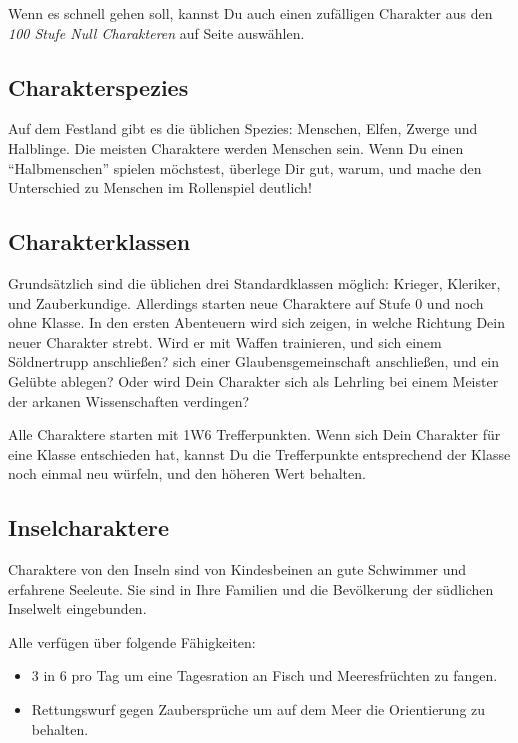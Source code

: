 \documentclass[11pt]{wbzine}
\begin{document}
\begin{multicols}{2}
Wenn es schnell gehen soll, kannst Du auch einen zufälligen
Charakter aus den \textit{100 Stufe Null Charakteren} auf Seite
\pageref{100char} auswählen.

\subsection{Charakterspezies}

Auf dem Festland gibt es die üblichen Spezies: Menschen, Elfen,
Zwerge und Halblinge. Die meisten Charaktere werden Menschen sein.
Wenn Du einen ``Halbmenschen'' spielen möchstest, überlege Dir gut,
warum, und mache den Unterschied zu Menschen im Rollenspiel
deutlich!

\subsection{Charakterklassen}

Grundsätzlich sind die üblichen drei Standardklassen möglich:
Krieger, Kleriker, und Zauberkundige. Allerdings starten neue
Charaktere auf Stufe 0 und noch ohne Klasse. In den ersten
Abenteuern wird sich zeigen, in welche Richtung Dein neuer Charakter
strebt. Wird er mit Waffen trainieren, und sich einem Söldnertrupp
anschließen? sich einer Glaubensgemeinschaft anschließen, und ein
Gelübte ablegen? Oder wird Dein Charakter sich als Lehrling bei
einem Meister der arkanen Wissenschaften verdingen?

Alle Charaktere starten mit 1W6 Trefferpunkten. Wenn sich Dein
Charakter für eine Klasse entschieden hat, kannst Du die
Trefferpunkte entsprechend der Klasse noch einmal neu würfeln, und
den höheren Wert behalten.

\subsection{Inselcharaktere}

Charaktere von den Inseln sind von Kindesbeinen an gute Schwimmer
und erfahrene Seeleute. Sie sind in Ihre Familien und die
Bevölkerung der südlichen Inselwelt eingebunden.

Alle verfügen über folgende Fähigkeiten:

\begin{itemize}
    \item 3 in 6 pro Tag um eine Tagesration an Fisch und Meeresfrüchten zu
fangen.

\item Rettungswurf gegen Zaubersprüche um auf dem Meer die Orientierung
zu behalten.


\end{itemize}
\end{multicols}
\end{document}
